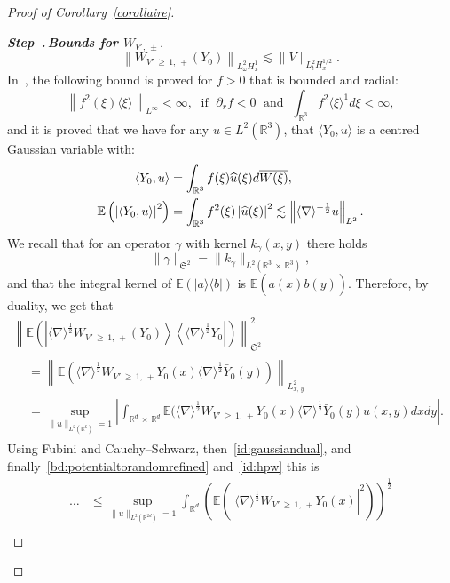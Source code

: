 \documentclass[AHL, Unicode, longabstracts,published]{cedram}
\newcommand{\R}{\mathbb{R}}
\newcommand{\E}{\mathbb{E}}
\newcommand{\frkS}{\mathfrak{S}}
\newcommand{\pa}{\partial}
\newcounter{stepcount}
\newenvironment{step}[1]{\refstepcounter{stepcount}\begin{proof}[{\bf{Step~\thestepcount}{.\,\emph{#1}}}]}{\let\qed\relax\end{proof}}
\let\oldhat\hat
\renewcommand*{\hat}[1]{\mathchoice{\widehat{#1}}{\widehat{#1}}{\oldhat{#1}}{\oldhat{#1}}}
\begin{document}
\begin{proof}[Proof of Corollary~\ref{corollaire}]
\begin{step}{{Bounds for $W_{V',\,\pm}$}}
\begin{equation}
\left\| W_{V'\,\geq\,1,\,+}(Y_0)\right\|_{L^2_\omega H^{1}_x}\lesssim \| V\|_{L^2_tH^{1/2}_x}.
\end{equation} In~\cite[Appendix~A]{CodS}, the following bound is proved for $f>0$ that is bounded and radial:
\begin{equation} \label{bd:pointwisefweighted}
\left\| f^2(\xi) \langle \xi \rangle \right\|_{L^{\infty}}<\infty, \; \text{ if }\; \pa_r f<0 \;\text{ and }\; \int_{\R^3} f^2\langle \xi \rangle^{1}d\xi<\infty,
\end{equation}
and it is proved that we have for any $u\in L^2(\R^3)$, that $\langle Y_0, u \rangle$ is a centred Gaussian variable with:
\begin{equation} \label{id:gaussiandual}
\begin{split}
\langle Y_0, u \rangle &=\int_{\R^3} f(\xi)\hat u(\xi)d\overline{W(\xi)}, \\
\E \left(\left|\langle Y_0, u \rangle\right|^2 \right) &=\int_{\R^3} f^2(\xi)\left|\hat u(\xi)\right|^2\lesssim \left\| \langle \nabla \rangle^{-\frac 12} u \right\|_{L^2}.
\end{split}
\end{equation}
We recall that for an operator $\gamma$ with kernel $k_\gamma (x,y)$ there holds
\[
\| \gamma\|_{\frkS^{2}}=\| k_\gamma \|_{L^2\left(\R^3\,\times\,\R^3\right)},
\]
and that the integral kernel of $\E(|a \rangle \langle b|) $ is $\E (a(x)\overline{b(y)})$. Therefore, by duality, we get that
\begin{multline*}
\left\| \E\left(\left|\langle \nabla \rangle^{\frac 12} W_{V'\,\geq\,1,\,+}(Y_0) \right\rangle \left\langle \langle \nabla \rangle^{\frac 12} Y_0\right|\right) \right\|_{\frkS^{2}}^2 \\
\begin{aligned}
&= \left\|\E \left(\langle \nabla \rangle^{\frac 12}W_{V'\,\geq\,1,\,+}Y_0(x) \langle \nabla\rangle^{\frac 12} \bar Y_0(y)\right)\right\|_{L^2_{x,\,y}}\\
& = \sup_{\| u\|_{L^2\left(\R^{6}\right)}=1} \left| \int_{\R^d\,\times\,\R^d} \E(\langle \nabla \rangle^{\frac 12}W_{V'\,\geq\,1,\,+}Y_0(x) \langle \nabla\rangle^{\frac 12} \bar Y_0(y) u(x,y)dxdy\right|.
\end{aligned}
\end{multline*}
 Using Fubini and Cauchy--Schwarz, then~\eqref{id:gaussiandual}, and finally~\eqref{bd:potentialtorandomrefined} and~\eqref{id:hpw} this is
\begin{align*}
\dots 
&\leq \sup_{\| u\|_{L^2\left(\R^{2d}\right)}=1}\int_{\R^d} \left(\E\left(\left|\langle \nabla \rangle^{\frac 12}W_{V'\,\geq\,1,\,+}Y_0(x)\right|^2\right)\right)^{\frac 12} \\

\end{align*}
\end{step}
\end{proof}
\end{document}
